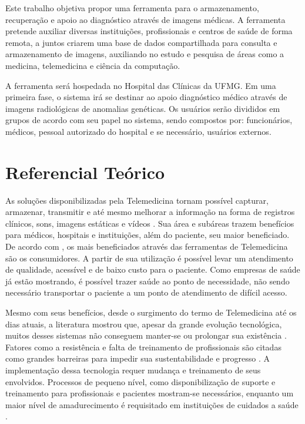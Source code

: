 Este trabalho objetiva propor uma ferramenta para o armazenamento, recuperação e apoio ao diagnóstico através de imagens médicas.
A ferramenta pretende auxiliar diversas instituições, profissionais e centros de saúde de forma remota, a juntos criarem uma base de dados compartilhada para consulta e armazenamento de imagens, auxiliando no estudo e pesquisa de áreas como a medicina, telemedicina e ciência da computação.

A ferramenta será hospedada no Hospital das Clínicas da UFMG.
Em uma primeira fase, o sistema irá se destinar ao apoio diagnóstico médico através de imagens radiológicas de anomalias genéticas.
Os usuários serão divididos em grupos de acordo com seu papel no sistema, sendo compostos por: funcionários, médicos, pessoal autorizado do hospital e se necessário, usuários externos.

\section{\esp Referencial Teórico}


As soluções disponibilizadas pela Telemedicina tornam possível capturar, armazenar, transmitir e até mesmo melhorar a informação na forma de registros clínicos, sons, imagens estáticas e vídeos \cite{REF02}.
Sua área e subáreas trazem benefícios para médicos, hospitais e instituições, além do paciente, seu maior beneficiado.
De acordo com \cite{REF04}, os mais beneficiados através das ferramentas de Telemedicina são os consumidores.
A partir de sua utilização é possível levar um atendimento de qualidade, acessível e de baixo custo para o paciente.
Como empresas de saúde já estão mostrando, é possível trazer saúde ao ponto de necessidade, não sendo necessário transportar o paciente a um ponto de atendimento de difícil acesso.

Mesmo com seus benefícios, desde o surgimento do termo de Telemedicina até os dias atuais, a literatura mostrou que, apesar da grande evolução tecnológica, muitos desses sistemas não conseguem manter-se ou prolongar sua existência \cite{REF16}.
Fatores como a resistência e falta de treinamento de profissionais são citadas como grandes barreiras para impedir sua sustentabilidade e progresso \cite{REF03}.
A implementação dessa tecnologia requer mudança e treinamento de seus envolvidos.
Processos de pequeno nível, como disponibilização de suporte e treinamento para profissionais e pacientes mostram-se necessários, enquanto um maior nível de amadurecimento é requisitado em instituições de cuidados a saúde \cite{REF06}.


